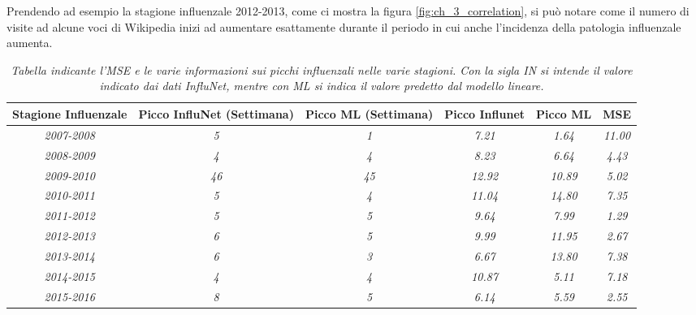 Prendendo ad esempio la stagione influenzale 2012-2013, come ci mostra la figura \ref{fig:ch_3_correlation}, si può notare 
come il numero di visite ad alcune voci di Wikipedia inizi ad aumentare esattamente durante il periodo in cui anche 
l'incidenza della patologia influenzale aumenta.
\bigskip

\begin{table}[p]
\centering
\begin{adjustbox}{max width=\textwidth}
\begin{tabular}{|c|c|c|c|c|c|}
\hline
\rowcolor[HTML]{EFEFEF} 
\textbf{Stagione Influenzale} & \textbf{Picco InfluNet (Settimana)} & \textbf{Picco ML (Settimana)} & \textbf{Picco Influnet} & \textbf{Picco ML} & \textbf{MSE}   \\ \hline
\textit{2007-2008}            & \textit{5}                          & \textit{1}                    & \textit{7.21}           & \textit{1.64}     & \textit{11.00} \\ \hline
\rowcolor[HTML]{FFFFFF} 
\textit{2008-2009}            & \textit{4}                          & \textit{4}                    & \textit{8.23}           & \textit{6.64}     & \textit{4.43}  \\ \hline
\rowcolor[HTML]{FFFFFF} 
\textit{2009-2010}            & \textit{46}                         & \textit{45}                   & \textit{12.92}          & \textit{10.89}    & \textit{5.02}  \\ \hline
\rowcolor[HTML]{FFFFFF} 
\textit{2010-2011}            & \textit{5}                          & \textit{4}                    & \textit{11.04}          & \textit{14.80}    & \textit{7.35}  \\ \hline
\rowcolor[HTML]{FFFFFF} 
\textit{2011-2012}            & \textit{5}                          & \textit{5}                    & \textit{9.64}           & \textit{7.99}     & \textit{1.29}  \\ \hline
\rowcolor[HTML]{FFFFFF} 
\textit{2012-2013}            & \textit{6}                          & \textit{5}                    & \textit{9.99}           & \textit{11.95}    & \textit{2.67}  \\ \hline
\rowcolor[HTML]{FFFFFF} 
\textit{2013-2014}            & \textit{6}                          & \textit{3}                    & \textit{6.67}           & \textit{13.80}    & \textit{7.38}  \\ \hline
\rowcolor[HTML]{FFFFFF} 
\textit{2014-2015}            & \textit{4}                          & \textit{4}                    & \textit{10.87}          & \textit{5.11}     & \textit{7.18}  \\ \hline
\rowcolor[HTML]{FFFFFF} 
\textit{2015-2016}            & \textit{8}                          & \textit{5}                    & \textit{6.14}           & \textit{5.59}     & \textit{2.55}  \\ \hline
\end{tabular}
\end{adjustbox}
\caption{\textit{Tabella indicante l'MSE e le varie informazioni sui picchi influenzali nelle varie stagioni. Con la sigla IN si intende il valore indicato dai dati InfluNet, mentre con ML si indica il valore predetto dal modello lineare.}}
\label{tab:linear_model}
\end{table}
\bigskip

